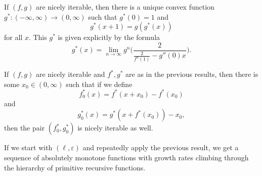 \documentclass[letterpaper,11pt]{article}
\begin{document}
\begin{prop} If $(f,g)$ are nicely iterable, then there is a unique convex function $g^*:(-\infty,\infty) \rightarrow (0,\infty)$ such that $g^*(0) = 1$ and
\[
g^*(x+1) = g(g^*(x))
\]
for all $x$. This $g^*$ is given explicitly by the formula
\[
g^*(x) = \lim_{n\rightarrow\infty} g^n\Big(\frac{2}{\frac{2}{f^n(1)} - g''(0)x}\Big).
\]
\end{prop}

\begin{prop} If $(f,g)$ are nicely iterable and $f^*, g^*$ are as in the previous results, then there is some $x_0 \in (0,\infty)$ such that if we define
\[
f_0^*(x) = f^*(x + x_0) - f^*(x_0)
\]
and
\[
g_0^*(x) = g^*(x + f^*(x_0)) - x_0,
\]
then the pair $(f_0^*,g_0^*)$ is nicely iterable as well.
\end{prop}

If we start with $(\ell,\varepsilon)$ and repeatedly apply the previous result, we get a sequence of absolutely monotone functions with growth rates climbing through the hierarchy of primitive recursive functions.



\end{document}
